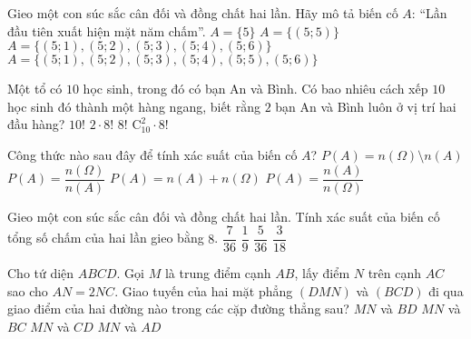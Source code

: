 \begin{ex}%
	Gieo một con súc sắc cân đối và đồng chất hai lần. Hãy mô tả biến cố $A$: “Lần đầu tiên xuất hiện mặt năm chấm”.
	\choice
	{$A=\{ 5 \}$}
	{$A=\{ (5;5) \}$}
	{$A=\{ (5;1),(5;2),(5;3),(5;4),(5;6) \}$}
	{\True $A=\{ (5;1),(5;2),(5;3),(5;4),(5;5),(5;6) \}$}
\end{ex}
\begin{ex}%
	Một tổ có $10$ học sinh, trong đó có bạn An và Bình. Có bao nhiêu cách xếp $10$ học sinh đó thành một hàng ngang, biết rằng $2$ bạn An và Bình luôn ở vị trí hai đầu hàng?
	\choice
	{$10!$}
	{\True $2\cdot 8!$}
	{$8!$}
	{$\mathrm{C}_{10}^2\cdot 8!$}
\end{ex}
\begin{ex}%
	Công thức nào sau đây để tính xác suất của biến cố $A$?
	\choice
	{$P(A)=n(\Omega )\setminus n(A)$}
	{$P(A)=\dfrac{n(\Omega )}{n(A)}$}
	{$P(A)=n(A)+n(\Omega )$}
	{\True $P(A)=\dfrac{n(A)}{n(\Omega )}$}
\end{ex}
\begin{ex}%
	Gieo một con súc sắc cân đối và đồng chất hai lần. Tính xác suất của biến cố tổng số chấm của hai lần gieo bằng $8$.
	\choice
	{$\dfrac{7}{36}$}
	{$\dfrac{1}{9}$}
	{\True $\dfrac{5}{36}$}
	{$\dfrac{3}{18}$}
\end{ex}
\begin{ex}%
	Cho tứ diện $ABCD$. Gọi $M$ là trung điểm cạnh $AB$, lấy điểm $N$ trên cạnh $AC$ sao cho $AN=2NC$. Giao tuyến của hai mặt phẳng $(DMN)$ và $(BCD)$ đi qua giao điểm của hai đường nào trong các cặp đường thẳng sau?
	\choice
	{$MN$ và $BD$}
	{\True $MN$ và $BC$}
	{$MN$ và $CD$}
	{$MN$ và $AD$}
\end{ex}
